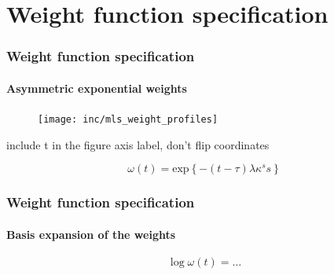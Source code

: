 \documentclass{snedecorbeamer}
\begin{document}
\section{Weight function specification %
}

\begin{frame}
  \frametitle{Weight function specification}
  \framesubtitle{Asymmetric exponential weights}

  \begin{figure}
    \centering
    \texttt{[image: inc/mls\_weight\_profiles]}
  \end{figure}

  include t in the figure axis label, don't flip coordinates

  \begin{equation}
    \omega(t)
    =
    \text{exp}\left\{-(t - \tau)\lambda\kappa^s s\right\}
  \end{equation}

  \blankfootnote{
    Space:
    $\omega(t): \mathcal{T} = [0, 1] \to (0, 1]$,
    $s = \text{sign}(t - \tau)$,
    $\tau\in[0,1]$,
    $\lambda > 0$,
    $\kappa > 0$ \\
  }
\end{frame}

\begin{frame}
  \frametitle{Weight function specification}
  \framesubtitle{Basis expansion of the weights}

  \begin{equation}
    \log\omega(t)
    =
    \dots
  \end{equation}

  \blankfootnote{
    Space:
    $\omega(t): \mathcal{T} = [0, 1] \to (0, 1]$,
    $s = \text{sign}(t - \tau)$,
    $\tau\in[0,1]$,
    $\lambda > 0$,
    $\kappa > 0$ \\
    \hspace{3.25ex}
    Identifiability: (i) $\phi = 1$, (ii) $\psi_{c,0} = 0$,
    (iii) $\max_\mathcal{T}\omega(t) = 1$, or (iv)
    $\int_\mathcal{T}\omega(t)\dx{t} = 1$
  }
\end{frame}
\end{document}
